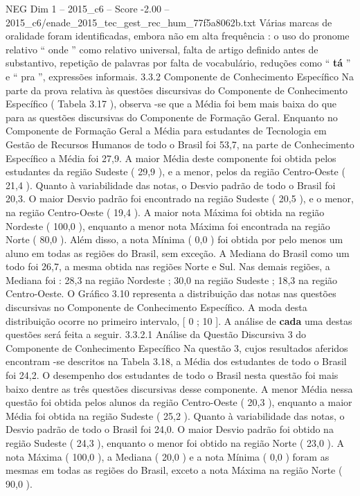 \begin{textsample}{NEG Dim 1 – 2015\_c6 – Score -2.00 – 2015\_c6/enade\_2015\_tec\_gest\_rec\_hum\_77f5a8062b.txt}
Várias marcas de oralidade foram identificadas, embora não em alta frequência : o uso do pronome relativo “ onde ” como relativo universal, falta de artigo definido antes de substantivo, repetição de palavras por falta de vocabulário, reduções como “ \textbf{tá} ” e “ pra ”, expressões informais. 3.3.2 Componente de Conhecimento Específico Na parte da prova relativa às questões discursivas do Componente de Conhecimento Específico ( Tabela 3.17 ), observa -se que a Média foi bem mais baixa do que para as questões discursivas do Componente de Formação Geral.
Enquanto no Componente de Formação Geral a Média para estudantes de Tecnologia em Gestão de Recursos Humanos de todo o Brasil foi 53,7, na parte de Conhecimento Específico a Média foi 27,9.
A maior Média deste componente foi obtida pelos estudantes da região Sudeste ( 29,9 ), e a menor, pelos da região Centro-Oeste ( 21,4 ).
Quanto à variabilidade das notas, o Desvio padrão de todo o Brasil foi 20,3.
O maior Desvio padrão foi encontrado na região Sudeste ( 20,5 ), e o menor, na região Centro-Oeste ( 19,4 ).
A maior nota Máxima foi obtida na região Nordeste ( 100,0 ), enquanto a menor nota Máxima foi encontrada na região Norte ( 80,0 ).
Além disso, a nota Mínima ( 0,0 ) foi obtida por pelo menos um aluno em todas as regiões do Brasil, sem exceção.
A Mediana do Brasil como um todo foi 26,7, a mesma obtida nas regiões Norte e Sul.
Nas demais regiões, a Mediana foi : 28,3 na região Nordeste ; 30,0 na região Sudeste ; 18,3 na região Centro-Oeste.
O Gráfico 3.10 representa a distribuição das notas nas questões discursivas no Componente de Conhecimento Específico.
A moda desta distribuição ocorre no primeiro intervalo, [ 0 ; 10 ].
A análise de \textbf{cada} uma destas questões será feita a seguir. 3.3.2.1 Análise da Questão Discursiva 3 do Componente de Conhecimento Específico Na questão 3, cujos resultados aferidos encontram -se descritos na Tabela 3.18, a Média dos estudantes de todo o Brasil foi 24,2.
O desempenho dos estudantes de todo o Brasil nesta questão foi mais baixo dentre as três questões discursivas desse componente.
A menor Média nessa questão foi obtida pelos alunos da região Centro-Oeste ( 20,3 ), enquanto a maior Média foi obtida na região Sudeste ( 25,2 ).
Quanto à variabilidade das notas, o Desvio padrão de todo o Brasil foi 24,0.
O maior Desvio padrão foi obtido na região Sudeste ( 24,3 ), enquanto o menor foi obtido na região Norte ( 23,0 ).
A nota Máxima ( 100,0 ), a Mediana ( 20,0 ) e a nota Mínima ( 0,0 ) foram as mesmas em todas as regiões do Brasil, exceto a nota Máxima na região Norte ( 90,0 ).

\end{textsample}
